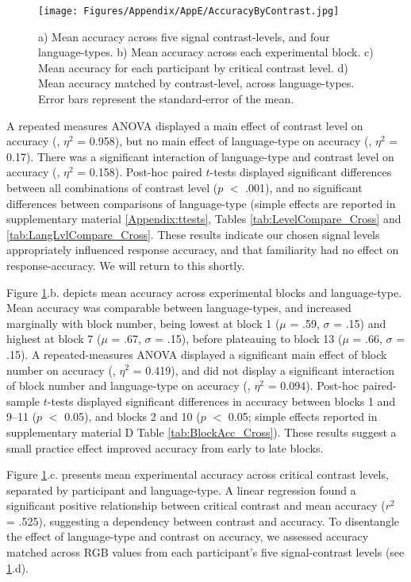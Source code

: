 \begin{figure}[tbh]
\centering \texttt{[image: Figures/Appendix/AppE/AccuracyByContrast.jpg]}
\caption{a) Mean accuracy across five signal contrast-levels, and four language-types. b) Mean accuracy across each experimental block. c) Mean accuracy for each participant by critical contrast level. d) Mean accuracy matched by contrast-level, across language-types. Error bars represent the standard-error of the mean.}
\label{fig:AccContrast_Cross}
\end{figure}

A repeated measures ANOVA displayed a main effect of contrast level on accuracy (, $\eta^2$ = 0.958), but no main effect of language-type on accuracy (, $\eta^2$ = 0.17). There was a significant interaction of language-type and contrast level on accuracy (, $\eta^2$ = 0.158). Post-hoc paired $t$-tests displayed significant differences between all combinations of contrast level ($p$ $<$ .001), and no significant differences between comparisons of language-type (simple effects are reported in supplementary material \ref{Appendix:ttests}, Tables \ref{tab:LevelCompare_Cross} and \ref{tab:LangLvlCompare_Cross}. These results indicate our chosen signal levels appropriately influenced response accuracy, and that familiarity had no effect on response-accuracy. We will return to this shortly. 

Figure \ref{fig:AccContrast_Cross}.b. depicts mean accuracy across experimental blocks and language-type. Mean accuracy was comparable between language-types, and increased marginally with block number, being lowest at block 1 ($\mu$ = .59, $\sigma$ = .15) and highest at block 7 ($\mu$ = .67, $\sigma$ = .15), before plateauing to block 13 ($\mu$ = .66, $\sigma$ = .15). A repeated-measures ANOVA displayed a significant main effect of block number on accuracy (, $\eta^2$ = 0.419), and did not display a significant interaction of block number and language-type on accuracy (, $\eta^2$ = 0.094). Post-hoc paired-sample $t$-tests displayed significant differences in accuracy between blocks 1 and 9--11 ($p$ $<$ 0.05), and blocks 2 and 10 ($p$ $<$ 0.05; simple effects reported in supplementary material D Table \ref{tab:BlockAcc_Cross}). These results suggest a small practice effect improved accuracy from early to late blocks.

Figure \ref{fig:AccContrast_Cross}.c. presents mean experimental accuracy across critical contrast levels, separated by participant and language-type. A linear regression found a significant positive relationship between critical contrast and mean accuracy ($r^2$ = .525), suggesting a dependency between contrast and accuracy. To disentangle the effect of language-type and contrast on accuracy, we assessed accuracy matched across RGB values from each participant's five signal-contrast levels (see \ref{fig:AccContrast_Cross}.d).

